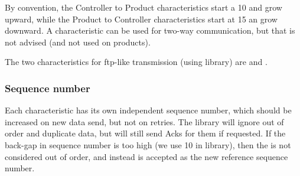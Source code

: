 By convention, the Controller to Product characteristics start a 10 and grow upward, while the Product to Controller characteristics start at 15 an grow downward. A characteristic can be used for two-way communication, but that is not advised (and not used on products).


The two characteristics for ftp-like transmission (using  library) are  and .


\subsubsection{Sequence number}

Each characteristic has its own independent sequence number, which should be increased on new data send, but not on retries. The  library will ignore out of order and duplicate data, but will still send Acks for them if requested. If the back-gap in sequence number is too high (we use 10 in  library), then the  is not considered out of order, and instead is accepted as the new reference sequence number.

